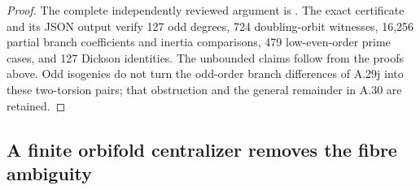 \begin{proof}
The complete independently reviewed argument is
.
The exact certificate
and its JSON output verify 127 odd degrees,
724 doubling-orbit witnesses, 16,256 partial
branch coefficients and inertia comparisons,
479 low-even-order prime cases, and 127 Dickson
identities. The unbounded claims follow from
the proofs above. Odd isogenies do not turn
the odd-order branch differences of A.29j into
these two-torsion pairs; that obstruction and
the general remainder in A.30 are retained.
\end{proof}

\subsection{A finite orbifold centralizer removes the fibre ambiguity}

